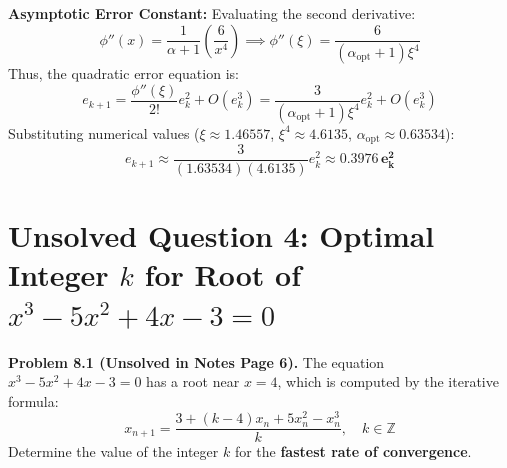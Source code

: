 \documentclass[11pt,a4paper]{article}
\numberwithin{equation}{section}
\begin{document}
\begin{solbox}
\noindent\textbf{Asymptotic Error Constant:}
Evaluating the second derivative:
\begin{equation}
    \phi''(x) = \frac{1}{\alpha + 1} \left( \frac{6}{x^4} \right) \implies \phi''(\xi) = \frac{6}{(\alpha_{\text{opt}} + 1)\xi^4}
\end{equation}
Thus, the quadratic error equation is:
\begin{equation}
    e_{k+1} = \frac{\phi''(\xi)}{2!} e_k^2 + O(e_k^3) = \frac{3}{(\alpha_{\text{opt}} + 1)\xi^4} e_k^2 + O(e_k^3)
\end{equation}
Substituting numerical values ($\xi \approx 1.46557$, $\xi^4 \approx 4.6135$, $\alpha_{\text{opt}} \approx 0.63534$):
\begin{equation}
    e_{k+1} \approx \frac{3}{(1.63534)(4.6135)} e_k^2 \approx \mathbf{0.3976 \, e_k^2}
\end{equation}
\end{solbox}

\section{Unsolved Question 4: Optimal Integer \texorpdfstring{$k$}{k} for Root of \texorpdfstring{$x^3 - 5x^2 + 4x - 3 = 0$}{x^3 - 5x^2 + 4x - 3 = 0}}

\begin{thmbox}
\textbf{Problem 8.1 (Unsolved in Notes Page 6).}
The equation $x^3 - 5x^2 + 4x - 3 = 0$ has a root near $x = 4$, which is computed by the iterative formula:
\begin{equation}
    x_{n+1} = \frac{3 + (k - 4) x_n + 5 x_n^2 - x_n^3}{k}, \quad k \in \mathbb{Z}
\end{equation}
Determine the value of the integer $k$ for the \textbf{fastest rate of convergence}.
\end{thmbox}
\end{document}
